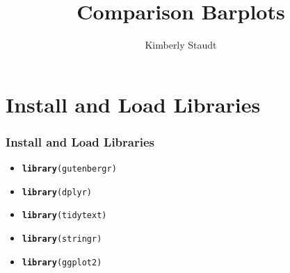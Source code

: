 \documentclass{beamer}\usepackage[]{graphicx}\usepackage[]{color}
\makeatletter
\newcommand{\hlstd}[1]{\textcolor[rgb]{0.345,0.345,0.345}{#1}}%
\newcommand{\hlkwd}[1]{\textcolor[rgb]{0.737,0.353,0.396}{\textbf{#1}}}%
\newenvironment{kframe}{%
 \def\at@end@of@kframe{}%
 \ifinner\ifhmode%
  \def\at@end@of@kframe{\end{minipage}}%
  \begin{minipage}{\columnwidth}%
 \fi\fi%
 \def\FrameCommand##1{\hskip\@totalleftmargin \hskip-\fboxsep
 \colorbox{shadecolor}{##1}\hskip-\fboxsep
     \hskip-\linewidth \hskip-\@totalleftmargin \hskip\columnwidth}%
 \MakeFramed {\advance\hsize-\width
   \@totalleftmargin\z@ \linewidth\hsize
   \@setminipage}}%
 {\par\unskip\endMakeFramed%
 \at@end@of@kframe}
\newenvironment{knitrout}{}{} %
\makeatother
\begin{document}
\title{Comparison Barplots}
\author{Kimberly Staudt}

\begin{frame}
\titlepage
\end{frame}

\section{Install and Load Libraries}
\begin{frame}[fragile]
  \frametitle{Install and Load Libraries}
  \begin{itemize}
  \item<1->
\begin{knitrout}
\color{fgcolor}\begin{kframe}
\begin{alltt}
  \hlkwd{library}\hlstd{(gutenbergr)}
\end{alltt}
\end{kframe}
\end{knitrout}
  \item<2->
\begin{knitrout}
\color{fgcolor}\begin{kframe}
\begin{alltt}
  \hlkwd{library}\hlstd{(dplyr)}
\end{alltt}
\end{kframe}
\end{knitrout}
  \item<3->
\begin{knitrout}
\color{fgcolor}\begin{kframe}
\begin{alltt}
  \hlkwd{library}\hlstd{(tidytext)}
\end{alltt}
\end{kframe}
\end{knitrout}
  \item<4->
\begin{knitrout}
\color{fgcolor}\begin{kframe}
\begin{alltt}
  \hlkwd{library}\hlstd{(stringr)}
\end{alltt}
\end{kframe}
\end{knitrout}
  \item<5->
\begin{knitrout}
\color{fgcolor}\begin{kframe}
\begin{alltt}
  \hlkwd{library}\hlstd{(ggplot2)}
\end{alltt}
\end{kframe}
\end{knitrout}
  
  
  \end{itemize}
\end{frame}
\end{document}
